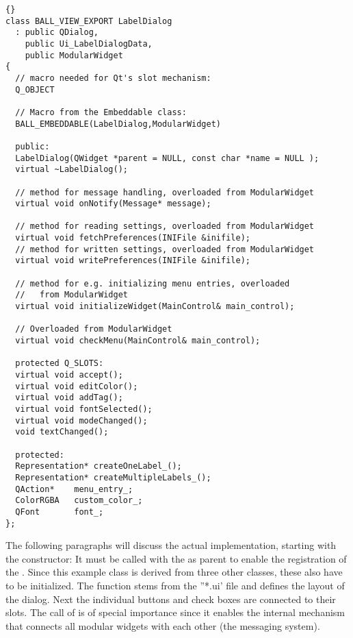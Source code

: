 \begin{lstlisting}{}
class BALL_VIEW_EXPORT LabelDialog 
  : public QDialog,
    public Ui_LabelDialogData,
    public ModularWidget
{
  // macro needed for Qt's slot mechanism:
  Q_OBJECT

  // Macro from the Embeddable class:
  BALL_EMBEDDABLE(LabelDialog,ModularWidget)
	
  public:
  LabelDialog(QWidget *parent = NULL, const char *name = NULL );
  virtual ~LabelDialog();
					
  // method for message handling, overloaded from ModularWidget
  virtual void onNotify(Message* message);
					
  // method for reading settings, overloaded from ModularWidget
  virtual void fetchPreferences(INIFile &inifile);
  // method for written settings, overloaded from ModularWidget
  virtual void writePreferences(INIFile &inifile);
		
  // method for e.g. initializing menu entries, overloaded
  //   from ModularWidget
  virtual void initializeWidget(MainControl& main_control);

  // Overloaded from ModularWidget
  virtual void checkMenu(MainControl& main_control);
	
  protected Q_SLOTS:
  virtual void accept();
  virtual void editColor();
  virtual void addTag();
  virtual void fontSelected();
  virtual void modeChanged();
  void textChanged();

  protected:
  Representation* createOneLabel_();
  Representation* createMultipleLabels_();
  QAction*    menu_entry_;
  ColorRGBA   custom_color_;
  QFont       font_;
};
\end{lstlisting}

The following paragraphs will discuss the actual implementation, starting 
with the constructor: It must be called with the  as 
parent to enable the registration of the . Since this 
example class is derived from three other classes, these also have to be 
initialized. The function  stems from the ''*.ui' file and 
defines the layout of the dialog. Next the individual buttons and check boxes 
are connected to their slots. The call of  is of 
special importance since it enables the internal mechanism that connects all 
modular widgets with each other (\ie the messaging system).

